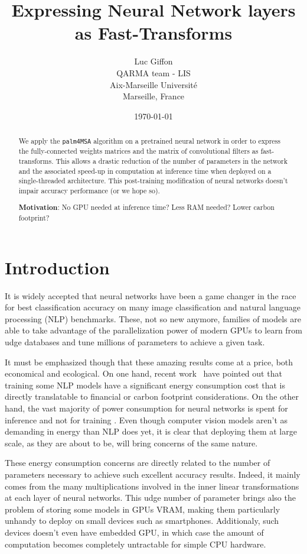 \documentclass[12pt]{article}
\title{Expressing Neural Network layers as Fast-Transforms}
\author{
        Luc Giffon \\
        QARMA team - LIS\\
        Aix-Marseille Universit\'e\\
        Marseille, France
}
\date{\today}
\def\palm{\texttt{palm4MSA}\xspace}
\begin{document}
\maketitle


\begin{abstract}
We apply the \palm algorithm on a pretrained neural network in order to express the fully-connected weights matrices and the matrix of convolutional filters as fast-transforms. This allows a drastic reduction of the number of parameters in the network and the associated speed-up in computation at inference time when deployed on a single-threaded architecture. This post-training modification of neural networks doesn't impair accuracy performance (or we hope so).

\textbf{Motivation}: No GPU needed at inference time? Less RAM needed? Lower carbon footprint?

\end{abstract}

\section{Introduction}
It is widely accepted that neural networks have been a game changer in the race for best classification accuracy on many image classification and natural language processing (NLP) benchmarks. These, not so new anymore, families of models are able to take advantage of the parallelization power of modern GPUs to learn from udge databases and tune millions of parameters to achieve a given task. 

It must be emphasized though that these amazing results come at a price, both economical and ecological. On one hand, recent work~\cite{DBLP:journals/corr/abs-1906-02243} have pointed out that training some NLP models have a significant energy consumption cost that is directly translatable to financial or carbon footprint considerations. On the other hand, the vast majority of power consumption for neural networks is spent for inference and not for training\cite{amazon_inferencepower} \cite{openai_aiandcompute}. Even though computer vision models aren't as demanding in energy than NLP does yet, it is clear that deploying them at large scale, as they are about to be, will bring concerns of the same nature.

These energy consumption concerns are directly related to the number of parameters necessary to achieve such excellent accuracy results. Indeed, it mainly comes from the many multiplications involved in the inner linear transformations at each layer of neural networks. This udge number of parameter brings also the problem of storing some models in GPUs VRAM, making them particularly unhandy to deploy on small devices such as smartphones. Additionaly, such devices doesn't even have embedded GPU, in which case the amount of computation becomes completely untractable for simple CPU hardware.
\end{document}
